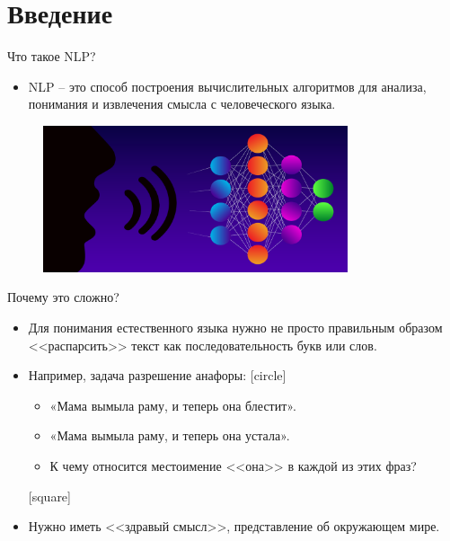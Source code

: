 \section{Введение}

\begin{frame}[c]{Что такое NLP?}


\begin{itemize}
	[square]
	\item NLP -- это способ  построения вычислительных алгоритмов для анализа, понимания и извлечения смысла с человеческого языка. 
\end{itemize}

\begin{figure}
\centering
\includegraphics[width=0.8\textwidth]{figures/intro.png}
\end{figure}

\end{frame}

\begin{frame}[c]{Почему это сложно?}

\begin{itemize}
	[square]
	\item Для понимания естественного языка нужно не просто правильным образом <<распарсить>> текст как последовательность букв или слов.
	\item Например, задача разрешение анафоры:
	[circle]
	\begin{itemize}
		\item «Мама вымыла раму, и теперь она блестит».
		\item «Мама вымыла раму, и теперь она устала».
		\item К чему относится местоимение <<она>> в каждой из этих фраз?
	\end{itemize}
	[square]
	\item Нужно иметь <<здравый смысл>>, представление об окружающем мире.
	
\end{itemize}
\end{frame}

